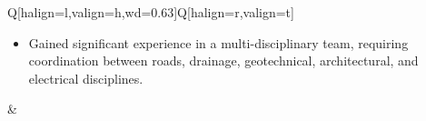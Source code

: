 \begin{table}[h!]
\begin{tblr}{Q[halign=l,valign=h,wd=0.63\textwidth]Q[halign=r,valign=t]}
{{\begin{itemize}
		 \item Gained significant experience in a multi-disciplinary team, requiring coordination between roads, drainage, geotechnical, architectural, and electrical disciplines.
	 \end{itemize}}
	} &  \\
    \end{tblr}
\end{table}
\FloatBarrier